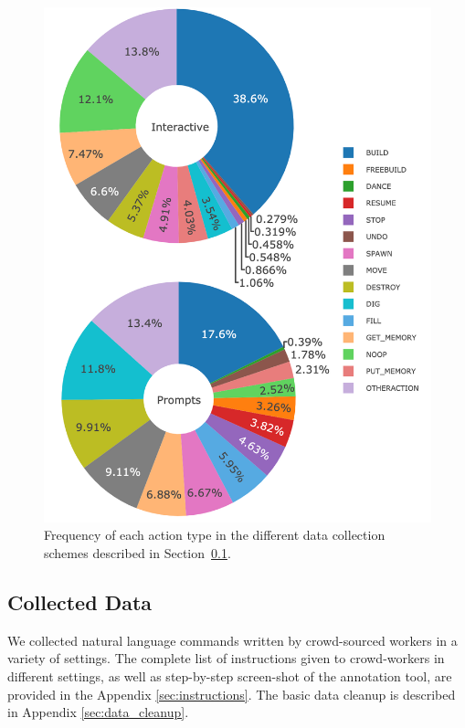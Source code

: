 \begin{figure}
\center
\includegraphics[width=0.9\linewidth ]{figures/action_freq2_vert.png}
\caption{Frequency of each action type in the different data collection schemes described in Section~\ref{sec:collected_data}.
\label{fig:action_freqs}
}
\end{figure}

\subsection{Collected Data}
\label{sec:collected_data}

We collected natural language commands written by crowd-sourced workers  in a variety of settings. The complete list of instructions given to crowd-workers in different settings, as well as step-by-step screen-shot of the annotation tool, are provided in the Appendix \ref{sec:instructions}.  The basic data cleanup is described in Appendix \ref{sec:data_cleanup}.


